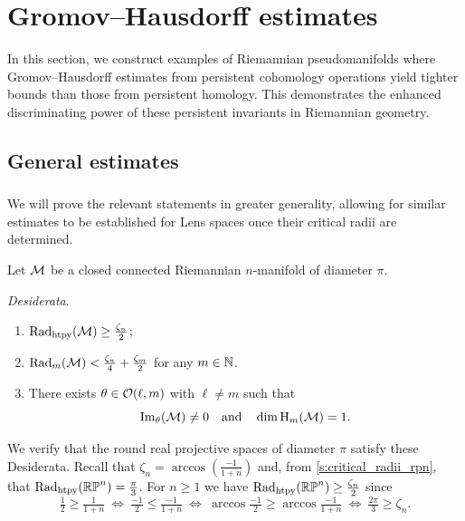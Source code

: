 
\section{Gromov--Hausdorff estimates}\label{s:gh_estimates}

In this section, we construct examples of Riemannian pseudomanifolds where Gromov--Hausdorff estimates from persistent cohomology operations yield tighter bounds than those from persistent homology.
This demonstrates the enhanced discriminating power of these persistent invariants in Riemannian geometry.

\subsection{General estimates}\label{ss:genberal_distance_comparison}

\subsubsection{}

We will prove the relevant statements in greater generality, allowing for similar estimates to be established for Lens spaces once their critical radii are determined.

\medskip\noindent Let $\mathcal{M}$ be a closed connected Riemannian \(n\)-manifold of diameter $\pi$.

\medskip\noindent\textit{\darkblue Desiderata}.\
\begin{enumerate}
	\item $\mathrm{Rad}_{\mathrm{htpy}}(\mathcal{M}) \geq \tfrac{\zeta_n}{2} $;
	\item $\mathrm{Rad}_{m}(\mathcal{M}) < \tfrac{\zeta_n}{4}+\tfrac{\zeta_m}{2}$ for any $m \in \mathbb{N}$.
	\item There exists $\theta \in \mathcal{O}(\ell, m)$ with \(\ell \neq m\) such that
	\[
	\operatorname{Im}_\theta(\mathcal{M}) \neq 0
	\quad\text{and}\quad
	\dim \operatorname{H}_m(\mathcal{M}) = 1.
	\]
\end{enumerate}

\medskip We verify that the round real projective spaces of diameter \(\pi\) satisfy these Desiderata.
Recall that \(\zeta_n = \arccos(\tfrac{-1}{1+n})\) and, from \cref{s:critical_radii_rpn}, that \(\mathrm{Rad}_{\mathrm{htpy}}(\mathbb{RP}^n) = \tfrac{\pi}{3}\).
For \(n \geq 1\) we have \(\mathrm{Rad}_{\mathrm{htpy}}(\mathbb{RP}^n) \geq \tfrac{\zeta_n}{2}\) since
\[
\tfrac{1}{2} \geq \tfrac{1}{1+n} \ \Leftrightarrow \
\tfrac{-1}{2} \leq \tfrac{-1}{1+n} \ \Leftrightarrow \
\arccos \tfrac{-1}{2} \geq \arccos\tfrac{-1}{1+n} \ \Leftrightarrow \
\tfrac{2\pi}{3} \geq \zeta_n.
\]

